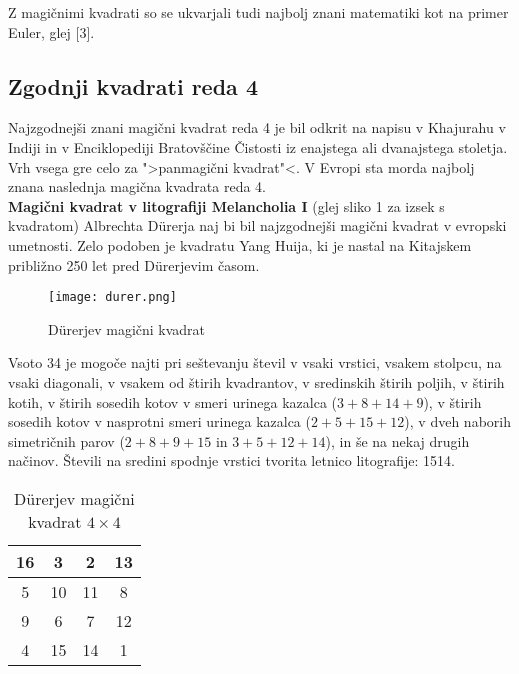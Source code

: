 \documentclass[a4paper,12pt]{article}
\begin{document}
Z magičnimi kvadrati so se ukvarjali tudi najbolj znani matematiki kot na
primer Euler, glej [3]. %


\subsection{Zgodnji kvadrati reda 4}

Najzgodnejši znani magični kvadrat reda 4 je bil odkrit na napisu
v Khajurahu v Indiji in v Enciklopediji Bratovščine Čistosti iz enajstega
ali dvanajstega stoletja. Vrh vsega gre celo za ">panmagični kvadrat"<.
V Evropi sta morda najbolj znana naslednja magična kvadrata reda 4.\\


\textbf{Magični kvadrat v litografiji Melancholia I }(glej sliko 1
za izsek s kvadratom) Albrechta Dürerja naj bi bil najzgodnejši magični kvadrat
v evropski umetnosti. Zelo podoben je kvadratu Yang Huija, ki je nastal na Kitajskem
približno 250 let pred Dürerjevim časom. %

\begin{figure}[h]
   \centering
   \caption{Dürerjev magični kvadrat}
   \label{fig:durer}
   \texttt{[image: durer.png]}
\end{figure}


Vsoto 34 je mogoče najti pri seštevanju števil v vsaki vrstici, vsakem stolpcu,
na vsaki diagonali, v vsakem od štirih kvadrantov, v sredinskih štirih poljih,
v štirih kotih, v štirih sosedih kotov v smeri urinega kazalca ($3+8+14+9$), v
štirih sosedih kotov v nasprotni smeri urinega kazalca ($2+5+15+12$), v dveh naborih
simetričnih parov ($2+8+9+15$ in $3+5+12+14$), in še na nekaj drugih načinov.
Števili na sredini spodnje vrstici tvorita letnico litografije: 1514.
%
\begin{table}[h]
   \centering
   \caption{Dürerjev magični kvadrat $4\times 4$}
   \label{table:durer}
   \begin{tabular}{|c|c|c|c|}
      \hline
      16 &  3 &  2 & 13\\
      \hline
      5 & 10 & 11 &  8 \\
      \hline
      9 &  6 &  7 & 12 \\
      \hline
      4 & 15 & 14 &  1 \\
      \hline

      
   \end{tabular}
   
\end{table}
\end{document}
